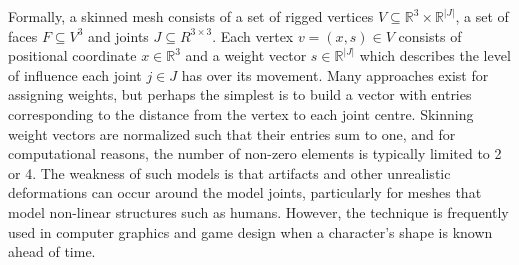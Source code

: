 
Formally, a skinned mesh consists of a set of rigged vertices $V \subseteq \mathbb{R}^3 \times \mathbb{R}^{|J|}$, a set of faces $F \subseteq V^3$ and joints $J \subseteq R^{3\times3}$. Each vertex $v = (x, s) \in V$ consists of positional coordinate $x \in \mathbb{R}^{3}$ and a weight vector $s \in \mathbb{R}^{|J|}$ which describes the level of influence each joint $j \in J$ has over its movement. Many approaches exist for assigning weights, but perhaps the simplest is to build a vector with entries corresponding to the distance from the vertex to each joint centre. Skinning weight vectors are normalized such that their entries sum to one, and for computational reasons, the number of non-zero elements is typically limited to 2 or 4. The weakness of such models is that artifacts and other unrealistic deformations can occur around the model joints, particularly for meshes that model non-linear structures such as humans. However, the technique is frequently used in computer graphics and game design when a character's shape is known ahead of time.


